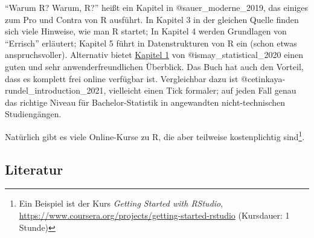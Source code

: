 \documentclass[
  letterpaper,
  DIV=11,
  numbers=noendperiod]{scrartcl}
\theoremstyle{definition}
\theoremstyle{definition}
\theoremstyle{definition}
\theoremstyle{remark}
\begin{document}
``Warum R? Warum, R?'' heißt ein Kapitel in @sauer\_moderne\_2019, das
einiges zum Pro und Contra von R ausführt. In Kapitel 3 in der gleichen
Quelle finden sich viele Hinweise, wie man R startet; In Kapitel 4
werden Grundlagen von ``Errisch'' erläutert; Kapitel 5 führt in
Datenstrukturen von R ein (schon etwas anspruchsvoller). Alternativ
bietet \href{https://moderndive.com/1-getting-started.html}{Kapitel 1}
von @ismay\_statistical\_2020 einen guten und sehr anwenderfreundlichen
Überblick. Das Buch hat auch den Vorteil, dass es komplett frei online
verfügbar ist. Vergleichbar dazu ist
@cetinkaya-rundel\_introduction\_2021, vielleicht einen Tick formaler;
auf jeden Fall genau das richtige Niveau für Bachelor-Statistik in
angewandten nicht-technischen Studiengängen.

Natürlich gibt es viele Online-Kurse zu R, die aber teilweise
kostenplichtig sind\footnote{Ein Beispiel ist der Kurs \emph{Getting
  Started with RStudio},
  \url{https://www.coursera.org/projects/getting-started-rstudio}
  (Kursdauer: 1 Stunde)}.

\subsection{Literatur}\label{literatur}
\end{document}
